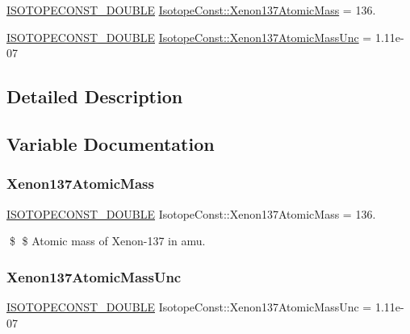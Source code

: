 \begin{DoxyCompactItemize}
\item 
\mbox{\hyperlink{group___isotope_const-_macros_ga8f45a7272ce02c0b4c65c44636ed719a}{I\+S\+O\+T\+O\+P\+E\+C\+O\+N\+S\+T\+\_\+\+D\+O\+U\+B\+LE}} \mbox{\hyperlink{group___isotope_const-_xenon-_xe137_ga3dbc1b35b4e164701c443c14fa2df2d9}{Isotope\+Const\+::\+Xenon137\+Atomic\+Mass}} = 136.
\item 
\mbox{\hyperlink{group___isotope_const-_macros_ga8f45a7272ce02c0b4c65c44636ed719a}{I\+S\+O\+T\+O\+P\+E\+C\+O\+N\+S\+T\+\_\+\+D\+O\+U\+B\+LE}} \mbox{\hyperlink{group___isotope_const-_xenon-_xe137_gaa1820922eb7b984eedc35cba7cd69001}{Isotope\+Const\+::\+Xenon137\+Atomic\+Mass\+Unc}} = 1.\+11e-\/07
\end{DoxyCompactItemize}


\subsection{Detailed Description}


\subsection{Variable Documentation}
\mbox{\label{group___isotope_const-_xenon-_xe137_ga3dbc1b35b4e164701c443c14fa2df2d9}} 
\subsubsection{\texorpdfstring{Xenon137\+Atomic\+Mass}{Xenon137AtomicMass}}
{\footnotesize\ttfamily \mbox{\hyperlink{group___isotope_const-_macros_ga8f45a7272ce02c0b4c65c44636ed719a}{I\+S\+O\+T\+O\+P\+E\+C\+O\+N\+S\+T\+\_\+\+D\+O\+U\+B\+LE}} Isotope\+Const\+::\+Xenon137\+Atomic\+Mass = 136.}

\$ \$ Atomic mass of Xenon-\/137 in amu. \mbox{\label{group___isotope_const-_xenon-_xe137_gaa1820922eb7b984eedc35cba7cd69001}} 
\subsubsection{\texorpdfstring{Xenon137\+Atomic\+Mass\+Unc}{Xenon137AtomicMassUnc}}
{\footnotesize\ttfamily \mbox{\hyperlink{group___isotope_const-_macros_ga8f45a7272ce02c0b4c65c44636ed719a}{I\+S\+O\+T\+O\+P\+E\+C\+O\+N\+S\+T\+\_\+\+D\+O\+U\+B\+LE}} Isotope\+Const\+::\+Xenon137\+Atomic\+Mass\+Unc = 1.\+11e-\/07}

